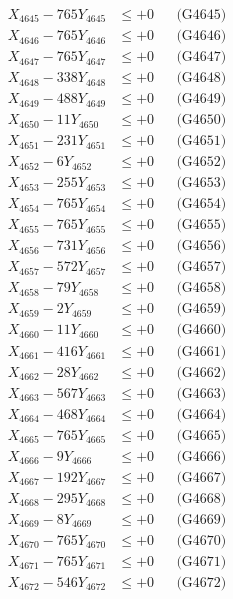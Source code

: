 \documentclass[a4paper,10pt]{article}
\begin{document}
{\begin{align}
X_{4645} - 765Y_{4645} &\leq +0 && \text{(G4645)} \\
X_{4646} - 765Y_{4646} &\leq +0 && \text{(G4646)} \\
X_{4647} - 765Y_{4647} &\leq +0 && \text{(G4647)} \\
X_{4648} - 338Y_{4648} &\leq +0 && \text{(G4648)} \\
X_{4649} - 488Y_{4649} &\leq +0 && \text{(G4649)} \\
X_{4650} - 11Y_{4650} &\leq +0 && \text{(G4650)} \\
\allowbreak
X_{4651} - 231Y_{4651} &\leq +0 && \text{(G4651)} \\
X_{4652} - 6Y_{4652} &\leq +0 && \text{(G4652)} \\
X_{4653} - 255Y_{4653} &\leq +0 && \text{(G4653)} \\
X_{4654} - 765Y_{4654} &\leq +0 && \text{(G4654)} \\
X_{4655} - 765Y_{4655} &\leq +0 && \text{(G4655)} \\
X_{4656} - 731Y_{4656} &\leq +0 && \text{(G4656)} \\
X_{4657} - 572Y_{4657} &\leq +0 && \text{(G4657)} \\
X_{4658} - 79Y_{4658} &\leq +0 && \text{(G4658)} \\
X_{4659} - 2Y_{4659} &\leq +0 && \text{(G4659)} \\
X_{4660} - 11Y_{4660} &\leq +0 && \text{(G4660)} \\
\allowbreak
X_{4661} - 416Y_{4661} &\leq +0 && \text{(G4661)} \\
X_{4662} - 28Y_{4662} &\leq +0 && \text{(G4662)} \\
X_{4663} - 567Y_{4663} &\leq +0 && \text{(G4663)} \\
X_{4664} - 468Y_{4664} &\leq +0 && \text{(G4664)} \\
X_{4665} - 765Y_{4665} &\leq +0 && \text{(G4665)} \\
X_{4666} - 9Y_{4666} &\leq +0 && \text{(G4666)} \\
X_{4667} - 192Y_{4667} &\leq +0 && \text{(G4667)} \\
X_{4668} - 295Y_{4668} &\leq +0 && \text{(G4668)} \\
X_{4669} - 8Y_{4669} &\leq +0 && \text{(G4669)} \\
X_{4670} - 765Y_{4670} &\leq +0 && \text{(G4670)} \\
\allowbreak
X_{4671} - 765Y_{4671} &\leq +0 && \text{(G4671)} \\
X_{4672} - 546Y_{4672} &\leq +0 && \text{(G4672)} \\

\end{align}}
\end{document}
